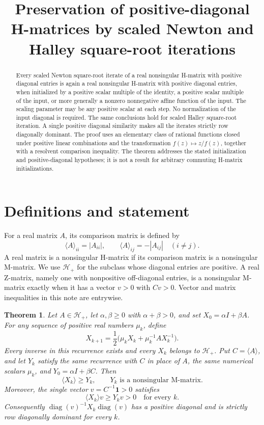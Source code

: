 \documentclass[11pt]{article}
\title{Preservation of positive-diagonal H-matrices by scaled Newton and Halley square-root iterations}
\author{}
\date{}
\newtheorem{theorem}{Theorem}
\newcommand{\comp}[1]{\langle #1\rangle}
\newcommand{\ones}{\mathbf 1}
\newcommand{\diag}{\operatorname{diag}}
\begin{document}
\maketitle
\begin{abstract}
Every scaled Newton square-root iterate of a real nonsingular H-matrix with positive diagonal entries is again a real nonsingular H-matrix with positive diagonal entries, when initialized by a positive scalar multiple of the identity, a positive scalar multiple of the input, or more generally a nonzero nonnegative affine function of the input. The scaling parameter may be any positive scalar at each step. No normalization of the input diagonal is required. The same conclusions hold for scaled Halley square-root iteration. A single positive diagonal similarity makes all the iterates strictly row diagonally dominant. The proof uses an elementary class of rational functions closed under positive linear combinations and the transformation $f(z)\mapsto z/f(z)$, together with a resolvent comparison inequality. The theorem addresses the stated initialization and positive-diagonal hypotheses; it is not a result for arbitrary commuting H-matrix initializations.
\end{abstract}

\section{Definitions and statement}
For a real matrix $A$, its comparison matrix is defined by
\[
\comp A_{ii}=|A_{ii}|,\qquad \comp A_{ij}=-|A_{ij}|\quad(i\ne j).
\]
A real matrix is a nonsingular H-matrix if its comparison matrix is a nonsingular M-matrix. We use $\mathcal H_+$ for the subclass whose diagonal entries are positive. A real Z-matrix, namely one with nonpositive off-diagonal entries, is a nonsingular M-matrix exactly when it has a vector $v>0$ with $Cv>0$. Vector and matrix inequalities in this note are entrywise.

\begin{theorem}\label{thm:newton}
Let $A\in\mathcal H_+$, let $\alpha,\beta\ge0$ with $\alpha+\beta>0$, and set $X_0=\alpha I+\beta A$. For any sequence of positive real numbers $\mu_k$, define
\begin{equation}\label{eq:newton}
X_{k+1}=\frac12\bigl(\mu_kX_k+\mu_k^{-1}A X_k^{-1}\bigr).
\end{equation}
Every inverse in this recurrence exists and every $X_k$ belongs to $\mathcal H_+$. Put $C=\comp A$, and let $Y_k$ satisfy the same recurrence with $C$ in place of $A$, the same numerical scalars $\mu_k$, and $Y_0=\alpha I+\beta C$. Then
\begin{equation}\label{eq:comparison}
\comp{X_k}\ge Y_k,\qquad Y_k\text{ is a nonsingular M-matrix}.
\end{equation}
Moreover, the single vector $v=C^{-1}\ones>0$ satisfies
\[
\comp{X_k}v\ge Y_kv>0\quad\text{for every }k.
\]
Consequently $\diag(v)^{-1}X_k\diag(v)$ has a positive diagonal and is strictly row diagonally dominant for every $k$.
\end{theorem}
\end{document}
